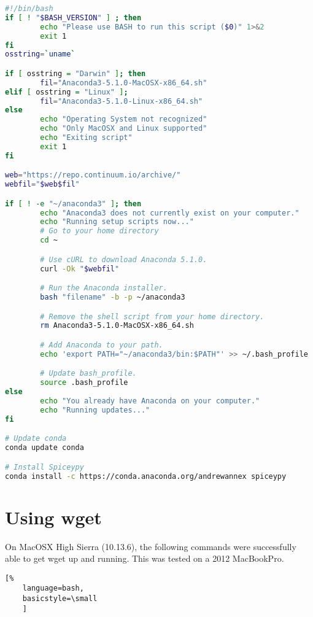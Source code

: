 \documentclass[crop=false,class=book]{standalone}
\begin{document}
\begin{lstlisting}[language=bash,frame=single,caption=rssconfig.sh shell script]
#!/bin/bash
if [ ! "$BASH_VERSION" ] ; then
        echo "Please use BASH to run this script ($0)" 1>&2
        exit 1
fi
osstring=`uname`

if [ osstring = "Darwin" ]; then
        fil="Anaconda3-5.1.0-MacOSX-x86_64.sh"
elif [ osstring = "Linux" ];
        fil="Anaconda3-5.1.0-Linux-x86_64.sh"
else
        echo "Operating System not recognized"
        echo "Only MacOSX and Linux supported"
        echo "Exiting script"
        exit 1
fi

web="https://repo.continuum.io/archive/"
webfil="$web$fil"

if [ ! -e "~/anaconda3" ]; then
        echo "Anaconda3 does not currently exist on your computer."
        echo "Running setup scripts now..."
        # Go to your home directory
        cd ~

        # Use cURL to download Anaconda 5.1.0.
        curl -Ok "$webfil"

        # Run the Anaconda installer.
        bash "filename" -b -p ~/anaconda3

        # Remove the shell script from your home directory.
        rm Anaconda3-5.1.0-MacOSX-x86_64.sh

        # Add Anaconda to your path.
        echo 'export PATH="~/anaconda3/bin:$PATH"' >> ~/.bash_profile

        # Update bash_profile.
        source .bash_profile
else
        echo "You already have Anaconda on your computer."
        echo "Running updates..."
fi

# Update conda
conda update conda

# Install Spiceypy
conda install -c https://conda.anaconda.org/andrewannex spiceypy
\end{lstlisting}
\section{Using wget}
On MacOSX High Sierra (10.13.6),
the following commands were
successfully able to get
wget up and running. This was
tested on a 2012 MacBookPro.
\begin{lstlisting}[%
    language=bash,
    basicstyle=\small
    ]


\end{lstlisting}
\end{document}
